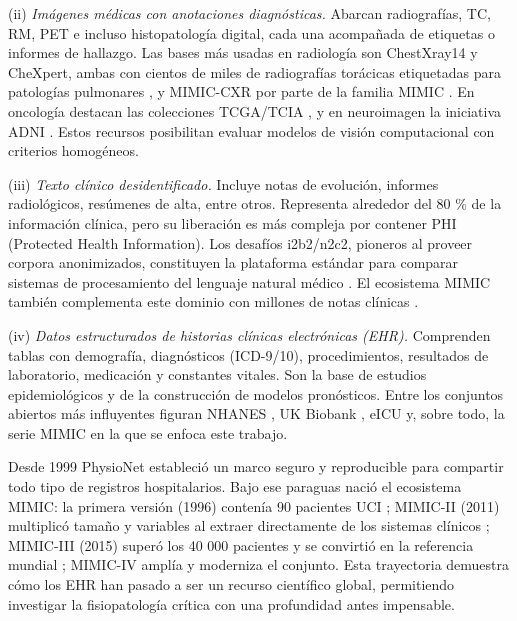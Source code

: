 (ii) \emph{Imágenes médicas con anotaciones diagnósticas.}  Abarcan radiografías, TC, RM, PET e incluso histopatología digital, cada una acompañada de etiquetas o informes de hallazgo.  Las bases más usadas en radiología son ChestXray14 y CheXpert, ambas con cientos de miles de radiografías torácicas etiquetadas para patologías pulmonares \cite{irvin2019chexpertlargechestradiograph}, y MIMIC-CXR por parte de la familia MIMIC \cite{Johnson2019_MIMICCXR}.  En oncología destacan las colecciones TCGA/TCIA \cite{TCGA,Clark2013_TCIA}, y en neuroimagen la iniciativa ADNI \cite{Petersen2010_ADNI}.  Estos recursos posibilitan evaluar modelos de visión computacional con criterios homogéneos.

(iii) \emph{Texto clínico desidentificado.}  Incluye notas de evolución, informes radiológicos, resúmenes de alta, entre otros.  Representa alrededor del 80 \% de la información clínica, pero su liberación es más compleja por contener PHI (Protected Health Information).  Los desafíos i2b2/n2c2, pioneros al proveer corpora anonimizados, constituyen la plataforma estándar para comparar sistemas de procesamiento del lenguaje natural médico \cite{n2c2}.  El ecosistema MIMIC también complementa este dominio con millones de notas clínicas \cite{Johnson2023_MIMICIVNote}. 

(iv) \emph{Datos estructurados de historias clínicas electrónicas (EHR).}  Comprenden tablas con demografía, diagnósticos (ICD-9/10), procedimientos, resultados de laboratorio, medicación y constantes vitales.  Son la base de estudios epidemiológicos y de la construcción de modelos pronósticos.  Entre los conjuntos abiertos más influyentes figuran NHANES \cite{NHANES}, UK Biobank \cite{Sudlow2015_UKBiobank}, eICU \cite{Pollard2018} y, sobre todo, la serie MIMIC en la que se enfoca este trabajo.

Desde 1999 PhysioNet \cite{PhysioNet_paper} estableció un marco seguro y reproducible para compartir todo tipo de registros hospitalarios.  Bajo ese paraguas nació el ecosistema MIMIC: la primera versión (1996) contenía 90 pacientes UCI \cite{Moody1996_MIMIC}; MIMIC-II (2011) multiplicó tamaño y variables al extraer directamente de los sistemas clínicos \cite{Saeed2011_MIMICII}; MIMIC-III (2015) superó los 40 000 pacientes y se convirtió en la referencia mundial \cite{MIMICIII_paper}; MIMIC-IV \cite{MIMICIV_paper} amplía y moderniza el conjunto.  Esta trayectoria demuestra cómo los EHR han pasado a ser un recurso científico global, permitiendo investigar la fisiopatología crítica con una profundidad antes impensable.

